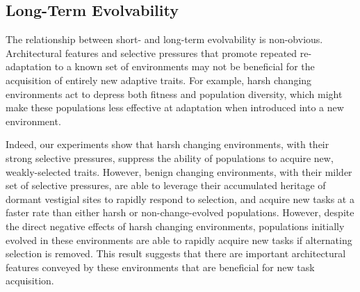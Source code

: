 \documentclass[10pt,letterpaper,final]{article}
\begin{document}


\subsection*{Long-Term Evolvability}
The relationship between short- and long-term evolvability is non-obvious. Architectural features and selective pressures that promote repeated re-adaptation to a known set of environments may not be beneficial for the acquisition of entirely new adaptive traits. For example, harsh changing environments act to depress both fitness and population diversity, which might make these populations less effective at adaptation when introduced into a new environment.

Indeed, our experiments show that harsh changing environments, with their strong selective pressures, suppress the ability of populations to acquire new, weakly-selected traits. However, benign changing environments, with their milder set of selective pressures, are able to leverage their accumulated heritage of dormant vestigial sites to rapidly respond to selection, and acquire new tasks at a faster rate than either harsh or non-change-evolved populations. However, despite the direct negative effects of harsh changing environments, populations initially evolved in these environments are able to rapidly acquire new tasks if alternating selection is removed. This result suggests that there are important architectural features conveyed by these environments that are beneficial for new task acquisition.
\end{document}
